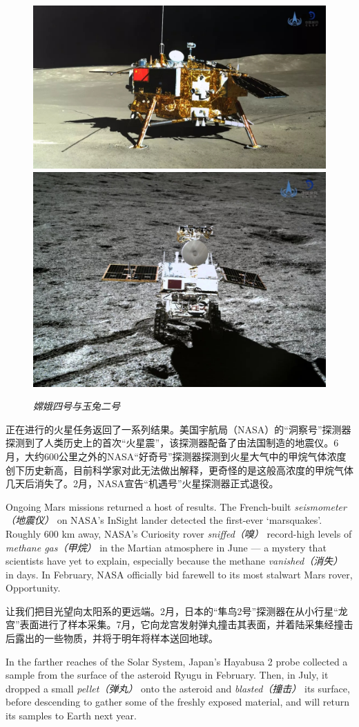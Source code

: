 \begin{multicols}{3}
\begin{figure}[H]
    \centering
    \includegraphics[height=0.3\linewidth]{IMG/202001/6782939.jpg}\hfill\includegraphics[height=0.3\linewidth]{IMG/202001/6782940.jpg}
    \caption{\textit{嫦娥四号与玉兔二号}}
    \label{fig:my_label}
\end{figure}

正在进行的火星任务返回了一系列结果。美国宇航局（NASA）的“洞察号”探测器探测到了人类历史上的首次“火星震”，该探测器配备了由法国制造的地震仪。6月，大约600公里之外的NASA“好奇号”探测器探测到火星大气中的甲烷气体浓度创下历史新高，目前科学家对此无法做出解释，更奇怪的是这般高浓度的甲烷气体几天后消失了。2月，NASA宣告“机遇号”火星探测器正式退役。


Ongoing Mars missions returned a host of results. The French-built \textit{seismometer（地震仪）} on NASA's InSight lander detected the first-ever ‘marsquakes’. Roughly 600 km away, NASA's Curiosity rover \textit{sniffed（嗅）} record-high levels of \textit{methane gas（甲烷）} in the Martian atmosphere in June — a mystery that scientists have yet to explain, especially because the methane \textit{vanished（消失）} in days. In February, NASA officially bid farewell to its most stalwart Mars rover, Opportunity.


让我们把目光望向太阳系的更远端。2月，日本的“隼鸟2号”探测器在从小行星“龙宫”表面进行了样本采集。7月，它向龙宫发射弹丸撞击其表面，并着陆采集经撞击后露出的一些物质，并将于明年将样本送回地球。


In the farther reaches of the Solar System, Japan's Hayabusa 2 probe collected a sample from the surface of the asteroid Ryugu in February. Then, in July, it dropped a small \textit{pellet（弹丸）} onto the asteroid and \textit{blasted（撞击）} its surface, before descending to gather some of the freshly exposed material, and will return its samples to Earth next year. 


\end{multicols}
